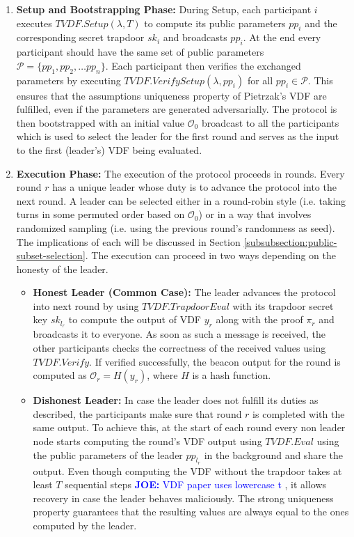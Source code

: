 \documentclass[letterpaper,twocolumn,10pt]{article}
\theoremstyle{definition}
\theoremstyle{remark}
\newcommand{\joenote}[1]{\textcolor{blue}{\textbf{JOE:} #1}}
\begin{document}
\begin{enumerate}
\item \textbf{Setup and Bootstrapping Phase:} During Setup, each participant $i$ executes $TVDF.Setup(\lambda,T)$ to compute its public parameters $pp_i$ and the corresponding secret trapdoor $sk_i$ and broadcasts $pp_i$. At the end every participant should have the same set of public parameters $\mathcal{P} = \{ pp_1, pp_2, \ldots pp_n \}$.  Each participant then verifies the exchanged parameters by executing $TVDF.VerifySetup(\lambda, pp_i)$ for all $pp_i \in \mathcal{P}$. This ensures that the assumptions uniqueness property of Pietrzak’s VDF \cite{pietrzak2018simple} are fulfilled, even if the parameters are generated adversarially. The protocol is then bootstrapped with an initial value $\mathcal{O}_0$ broadcast to all the participants which is used to select the leader for the first round and serves as the input to the first (leader’s) VDF being evaluated.

\item \textbf{Execution Phase:} The execution of the protocol proceeds in rounds. Every round $r$ has a unique leader whose duty is to advance the protocol into the next round. A leader can be selected either in a round-robin style (i.e. taking turns in some permuted order based on $\mathcal{O}_0$) or in a way that involves randomized sampling (i.e. using the previous round’s randomness as seed). The implications of each will be discussed in Section \ref{subsubsection:public-subset-selection}. The execution can proceed in two ways depending on the honesty of the leader.
\begin{itemize}
    \item \textbf{Honest Leader (Common Case):} The leader advances the protocol into next round by using $TVDF.TrapdoorEval$ with its trapdoor secret key $sk_{l_r}$ to compute the output of VDF $y_r$ along with the proof $\pi_r$ and broadcasts it to everyone. As soon as such a message is received, the other participants checks the correctness of the received values using $TVDF.Verify$. If verified successfully, the beacon output for the round is computed as $\mathcal{O}_r = H(y_r)$, where $H$ is a hash function.
    \item \textbf{Dishonest Leader:} In case the leader does not fulfill its duties as described, the participants make sure that round $r$ is completed with the same output. To achieve this, at the start of each round every non leader node starts computing the round’s VDF
    output using $TVDF.Eval$ using the public parameters of the leader $pp_{l_r}$ in the background and share the output. Even though computing the VDF without the trapdoor takes at least $T$ sequential steps \joenote{VDF paper uses lowercase t} , it allows recovery in case the leader behaves maliciously. The strong uniqueness property guarantees that the resulting values are always equal to the ones computed by the leader.
\end{itemize}
\end{enumerate}
\end{document}
